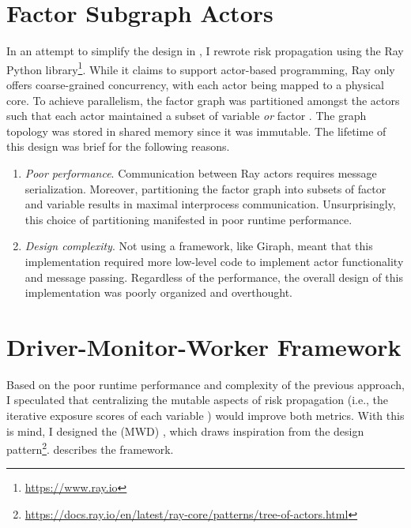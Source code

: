\section{Factor Subgraph Actors}\label{sec:subgraph-actors}

In an attempt to simplify the design in , I rewrote risk propagation using the Ray Python library\footnote{\url{https://www.ray.io}}. While it claims to support actor-based programming, Ray only offers coarse-grained concurrency, with each actor being mapped to a physical core. To achieve parallelism, the factor graph was partitioned amongst the actors such that each actor maintained a subset of variable \verticesName \emph{or} factor \verticesName. The graph topology was stored in shared memory since it was immutable. The lifetime of this design was brief for the following reasons.
  \begin{enumerate}
    \item \emph{Poor performance}. Communication between Ray actors requires message serialization. Moreover, partitioning the factor graph into subsets of factor \verticesName and variable \verticesName results in maximal interprocess communication. Unsurprisingly, this choice of partitioning manifested in poor runtime performance.
    \item \emph{Design complexity}. Not using a framework, like Giraph, meant that this implementation required more low-level code to implement actor functionality and message passing. Regardless of the performance, the overall design of this implementation was poorly organized and overthought.
  \end{enumerate}

\section{Driver-Monitor-Worker Framework}\label{sec:mwd-framework}

Based on the poor runtime performance and complexity of the previous approach, I speculated that centralizing the mutable aspects of risk propagation (i.e., the iterative exposure scores of each variable \vertexName) would improve both metrics. With this is mind, I designed the  (MWD) , which draws inspiration from the  design pattern\footnote{\url{https://docs.ray.io/en/latest/ray-core/patterns/tree-of-actors.html}}.  describes the framework.


